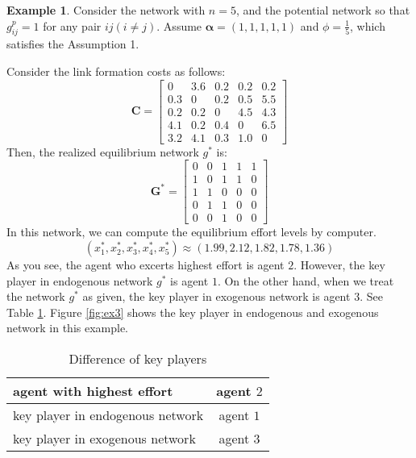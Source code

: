 \documentclass[12pt]{article}
\theoremstyle{definition}
\newtheorem{example}{Example}
\newcommand{\bm}[1]{\boldsymbol{#1}}
\begin{document}
\begin{example}
Consider the network with $n=5$, and the potential network so that $g_{ij}^p = 1$ for any pair $ij(i \neq j)$.
Assume $\bm{\alpha} = (1, 1, 1, 1, 1)$ and $\phi = \frac{1}{5}$, which satisfies the Assumption 1.

Consider the link formation costs as follows:
\[\bm{C} = \left[
			\begin{array}{ccccc}
				0 & 3.6 & 0.2 & 0.2 & 0.2 \\
				0.3 & 0 & 0.2 & 0.5 & 5.5 \\
				0.2 & 0.2 & 0 & 4.5 & 4.3 \\
				4.1 & 0.2 & 0.4 & 0 & 6.5 \\
				3.2 & 4.1 & 0.3 & 1.0 & 0
			\end{array} \right] \]
Then, the realized equilibrium network $g^*$ is:
\[\bm{G}^* = \left[
			\begin{array}{ccccc}
				0 & 0 & 1 & 1 & 1 \\
				1 & 0 & 1 & 1 & 0 \\
				1 & 1 & 0 & 0 & 0 \\
				0 & 1 & 1 & 0 & 0 \\
				0 & 0 & 1 & 0 & 0
			\end{array} \right] \]
In this network, we can compute the equilibrium effort levels by computer.
\[ (x_1^*, x_2^*, x_3^*, x_4^*, x_5^*) \approx (1.99, 2.12, 1.82, 1.78, 1.36) \]
As you see, the agent who excerts highest effort is agent $2$.
However, the key player in endogenous network $g^*$ is agent $1$.
On the other hand, when we treat the network $g^*$ as given, the key player in exogenous network is agent $3$.
See Table \ref{tab:key player}.
Figure \ref{fig:ex3} shows the key player in endogenous and exogenous network in this example.

\begin{table}[htb]
  \begin{center}
    \begin{tabular}{|l|c|} \hline
      agent with highest effort & agent $2$ \\ \hline
      key player in endogenous network & agent $1$ \\ \hline
      key player in exogenous network & agent $3$ \\ \hline
    \end{tabular}
    \caption{Difference of key players}
    \label{tab:key player}
  \end{center}
\end{table}
\end{example}
\end{document}
